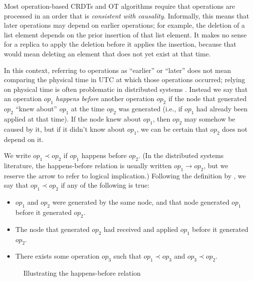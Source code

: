 Most operation-based CRDTs and OT algorithms require that operations are processed in an order that
is \emph{consistent with causality}. Informally, this means that later operations may depend on
earlier operations; for example, the deletion of a list element depends on the prior insertion of
that list element. It makes no sense for a replica to apply the deletion before it applies the
insertion, because that would mean deleting an element that does not yet exist at that time.

In this context, referring to operations as ``earlier'' or ``later'' does not mean comparing the
physical time in UTC at which those operations occurred; relying on physical time is often
problematic in distributed systems \cite{Sheehy:2015jm}. Instead we say that an operation
$\mathit{op}_1$ \emph{happens before} another operation $\mathit{op}_2$ if the node that generated
$\mathit{op}_2$ ``knew about'' $\mathit{op}_1$ at the time $\mathit{op}_2$ was generated (i.e., if
$\mathit{op}_1$ had already been applied at that time). If the node knew about $\mathit{op}_1$, then
$\mathit{op}_2$ may somehow be caused by it, but if it didn't know about $\mathit{op}_1$, we can be
certain that $\mathit{op}_2$ does not depend on it.

We write $\mathit{op}_1 \prec \mathit{op}_2$ if $\mathit{op}_1$ happens before $\mathit{op}_2$. (In
the distributed systems literature, the happens-before relation is usually written
$\mathit{op}_1 \longrightarrow \mathit{op}_2$, but we reserve the arrow to refer to logical
implication.) Following the definition by \citet{Lamport:1978jq}, we say that
$\mathit{op}_1 \prec \mathit{op}_2$ if any of the following is true:

\begin{itemize}
\item $\mathit{op}_1$ and $\mathit{op}_2$ were generated by the same node, and that node generated
    $\mathit{op}_1$ before it generated $\mathit{op}_2$.
\item The node that generated $\mathit{op}_2$ had received and applied $\mathit{op}_1$ before it
    generated $\mathit{op}_2$.
\item There exists some operation $\mathit{op}_3$ such that
    $\mathit{op}_1 \prec \mathit{op}_3$ and $\mathit{op}_3 \prec \mathit{op}_2$.
\end{itemize}

\begin{figure}
\centering

\caption{Illustrating the happens-before relation}\label{fig.happens-before}
\end{figure}

